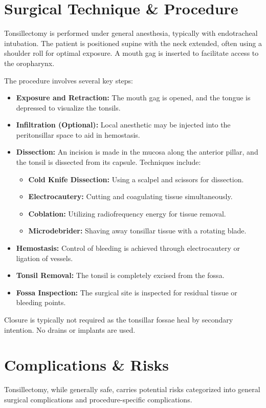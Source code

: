 \section*{Surgical Technique \& Procedure}
Tonsillectomy is performed under general anesthesia, typically with endotracheal intubation. The patient is positioned supine with the neck extended, often using a shoulder roll for optimal exposure. A mouth gag is inserted to facilitate access to the oropharynx.

The procedure involves several key steps:

\begin{itemize}
  \item \textbf{Exposure and Retraction:} The mouth gag is opened, and the tongue is depressed to visualize the tonsils.
  \item \textbf{Infiltration (Optional):} Local anesthetic may be injected into the peritonsillar space to aid in hemostasis.
  \item \textbf{Dissection:} An incision is made in the mucosa along the anterior pillar, and the tonsil is dissected from its capsule. Techniques include:
    \begin{itemize}
      \item \textbf{Cold Knife Dissection:} Using a scalpel and scissors for dissection.
      \item \textbf{Electrocautery:} Cutting and coagulating tissue simultaneously.
      \item \textbf{Coblation:} Utilizing radiofrequency energy for tissue removal.
      \item \textbf{Microdebrider:} Shaving away tonsillar tissue with a rotating blade.
    \end{itemize}
  \item \textbf{Hemostasis:} Control of bleeding is achieved through electrocautery or ligation of vessels.
  \item \textbf{Tonsil Removal:} The tonsil is completely excised from the fossa.
  \item \textbf{Fossa Inspection:} The surgical site is inspected for residual tissue or bleeding points.
\end{itemize}

Closure is typically not required as the tonsillar fossae heal by secondary intention. No drains or implants are used.

\section*{Complications \& Risks}
Tonsillectomy, while generally safe, carries potential risks categorized into general surgical complications and procedure-specific complications.

